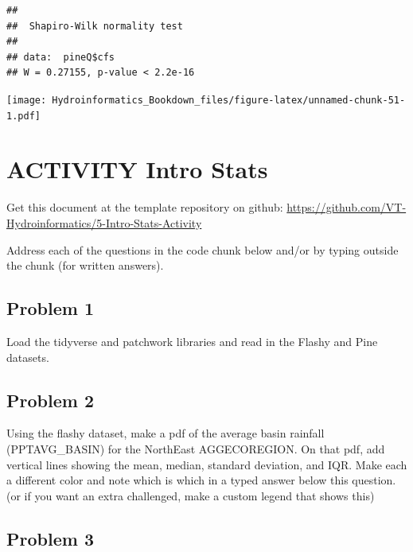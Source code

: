 \documentclass[
]{book}
\newenvironment{Shaded}{\begin{snugshade}}{\end{snugshade}}
\newcommand{\FunctionTok}[1]{\textcolor[rgb]{0.00,0.00,0.00}{#1}}
\newcommand{\NormalTok}[1]{#1}
\newcommand{\SpecialCharTok}[1]{\textcolor[rgb]{0.00,0.00,0.00}{#1}}
\begin{document}
\begin{verbatim}
## 
##  Shapiro-Wilk normality test
## 
## data:  pineQ$cfs
## W = 0.27155, p-value < 2.2e-16
\end{verbatim}

\begin{Shaded}
\end{Shaded}

\texttt{[image: Hydroinformatics\_Bookdown\_files/figure-latex/unnamed-chunk-51-1.pdf]}

\hypertarget{statsactivity}{%
\chapter{ACTIVITY Intro Stats}\label{statsactivity}}

Get this document at the template repository on github: \url{https://github.com/VT-Hydroinformatics/5-Intro-Stats-Activity}

Address each of the questions in the code chunk below and/or by typing outside the chunk (for written answers).

\hypertarget{problem-1-1}{%
\section{Problem 1}\label{problem-1-1}}

Load the tidyverse and patchwork libraries and read in the Flashy and Pine datasets.

\hypertarget{problem-2-1}{%
\section{Problem 2}\label{problem-2-1}}

Using the flashy dataset, make a pdf of the average basin rainfall (PPTAVG\_BASIN) for the NorthEast AGGECOREGION. On that pdf, add vertical lines showing the mean, median, standard deviation, and IQR. Make each a different color and note which is which in a typed answer below this question. (or if you want an extra challenged, make a custom legend that shows this)

\hypertarget{problem-3-1}{%
\section{Problem 3}\label{problem-3-1}}
\end{document}
